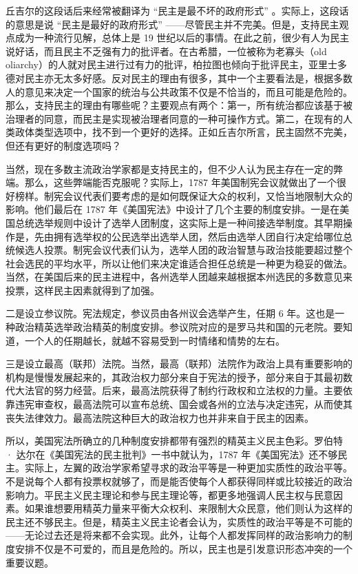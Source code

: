 丘吉尔的这段话后来经常被翻译为 “民主是最不坏的政府形式” 。实际上，这段话的意思是说 “民主是最好的政府形式” ——尽管民主并不完美。但是，支持民主观点成为一种流行见解，总体上是 19 世纪以后的事情。在此之前，很少有人为民主说好话，而且民主不乏强有力的批评者。在古希腊，一位被称为老寡头（old oliarchy）的人就对民主进行过有力的批评，柏拉图也倾向于批评民主，亚里士多德对民主亦无太多好感。反对民主的理由有很多，其中一个主要看法是，根据多数人的意见来决定一个国家的统治与公共政策不仅是不恰当的，而且可能是危险的。那么，支持民主的理由有哪些呢？主要观点有两个：第一，所有统治都应该基于被治理者的同意，而民主是实现被治理者同意的一种可操作方式。第二，在现有的人类政体类型选项中，找不到一个更好的选择。正如丘吉尔所言，民主固然不完美，但还有更好的制度选项吗？

当然，现在多数主流政治学家都是支持民主的，但不少人认为民主存在一定的弊端。那么，这些弊端能否克服呢？实际上，1787 年美国制宪会议就做出了一个很好榜样。制宪会议代表们要考虑的是如何既保证大众的权利，又恰当地限制大众的影响。他们最后在 1787 年《美国宪法》中设计了几个主要的制度安排。一是在美国总统选举规则中设计了选举人团制度，这实际上是一种间接选举制度。其早期操作是，先由拥有选举权的公民选举出选举人团，然后由选举人团自行决定给哪位总统候选人投票。制宪会议代表们认为，选举人团的政治智慧与政治技能要超过整个社会选民的平均水平，所以让他们来决定谁适合担任总统是一种更为稳妥的做法。当然，在美国后来的民主进程中，各州选举人团越来越根据本州选民的多数意见来投票，这样民主因素就得到了加强。

二是设立参议院。宪法规定，参议员由各州议会选举产生，任期 6 年。这也是一种政治精英选举政治精英的制度安排。参议院对应的是罗马共和国的元老院。要知道，一个人的任期越长，就越不容易受到一时情绪和情势的左右。

三是设立最高（联邦）法院。当然，最高（联邦）法院作为政治上具有重要影响的机构是慢慢发展起来的，其政治权力部分来自于宪法的授予，部分来自于其最初数代大法官的努力经营。后来，最高法院获得了制约行政权和立法权的力量。主要依靠违宪审查权，最高法院可以宣布总统、国会或各州的立法与决定违宪，从而使其丧失法律效力。最高法院这种巨大的政治权力也并非来自于民主的因素。

所以，美国宪法所确立的几种制度安排都带有强烈的精英主义民主色彩。罗伯特 · 达尔在《美国宪法的民主批判》一书中就认为，1787 年《美国宪法》还不够民主。实际上，左翼的政治学家希望寻求的政治平等是一种更加实质性的政治平等。不是说每个人都有投票权就够了，而是能否使每个人都获得同样或比较接近的政治影响力。平民主义民主理论和参与民主理论等，都更多地强调人民主权与民意因素。如果谁想要用精英力量来平衡大众权利、来限制大众民意，他们则认为这样的民主还不够民主。但是，精英主义民主论者会认为，实质性的政治平等是不可能的——无论过去还是将来都不会实现。此外，让每个人都发挥同样的政治影响力的制度安排不仅是不可爱的，而且是危险的。所以，民主也是引发意识形态冲突的一个重要议题。

